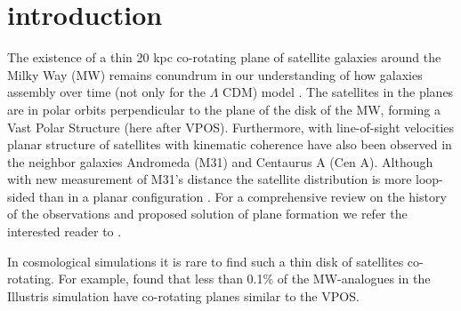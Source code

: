 \documentclass{aastex63}
\begin{document}





\section{introduction}\label{sec:intro}




The existence of a thin 20 kpc co-rotating plane of satellite galaxies around the Milky Way (MW)
remains conundrum in our understanding of how galaxies assembly over time (not only for the $\Lambda$ CDM) model \citep{BK21}. The satellites in the
planes are in polar orbits perpendicular to the plane of the disk of the MW,
forming a Vast Polar Structure (here after VPOS). Furthermore, with line-of-sight velocities planar structure of satellites with kinematic coherence have also been observed in the neighbor galaxies Andromeda (M31) and Centaurus A (Cen A). Although with new measurement of M31's distance the satellite distribution is more loop-sided than in a planar configuration \cite{Savino22}. For a comprehensive review on the history of the observations and proposed solution of plane formation we refer the interested reader to \cite{Pawlowski18, Pawlowski21, Pawlowski21b}. 


In cosmological simulations it is rare to find such a thin disk of satellites
co-rotating. For example, \cite{Pawlowski20} found that less than 0.1\% of the MW-analogues in the Illustris simulation have co-rotating planes similar to the VPOS.  
\end{document}
